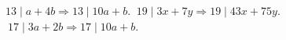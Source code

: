 $13 \mid a + 4b \Rightarrow 13 \mid 10a + b$. $\ 19 \mid 3x + 7y \Rightarrow 19 \mid 43x + 75y$. $\ 17 \mid 3a + 2b \Rightarrow 17 \mid 10a + b$.
